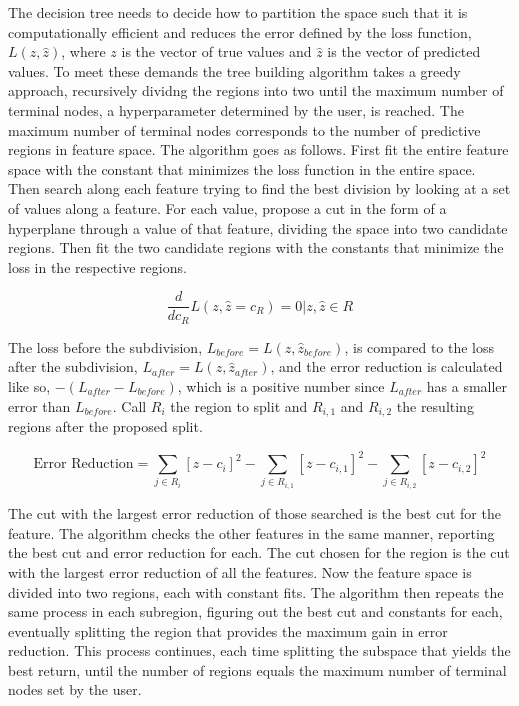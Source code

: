 \documentclass[12pt]{article}
\begin{document}
The decision tree needs to decide how to partition the space such that it is computationally efficient and reduces the error defined by the loss function, $L(z,\hat{z})$, where $z$ is the vector of true values and $\hat{z}$ is the vector of predicted values. To meet these demands the tree building algorithm takes a greedy approach, recursively dividng the regions into two until the maximum number of terminal nodes, a hyperparameter determined by the user, is reached. The maximum number of terminal nodes corresponds to the number of predictive regions in feature space. The algorithm goes as follows. First fit the entire feature space with the constant that minimizes the loss function in the entire space. Then search along each feature trying to find the best division by looking at a set of values along a feature. For each value, propose a cut in the form of a hyperplane through a value of that feature, dividing the space into two candidate regions. Then fit the two candidate regions with the constants that minimize the loss in the respective regions. 

\begin{equation}
\frac{d}{dc_{R}} L(z,\hat{z} = c_{R}) = 0 | z,\hat{z} \in R
\end{equation}

The loss before the subdivision, $L_{before} = L(z,\hat{z}_{before})$, is compared to the loss after the subdivision, $L_{after} = L(z,\hat{z}_{after})$, and the error reduction is calculated like so, $-(L_{after} - L_{before})$, which is a positive number since $L_{after}$ has a smaller error than $L_{before}$. Call $R_{i}$ the region to split and $R_{i,1}$ and $R_{i,2}$ the resulting regions after the proposed split. 

\begin{equation}
\textrm{Error Reduction} = \sum_{j \in R_{i}} [z-c_i]^2 - \sum_{j \in R_{i,1}} [z-c_{i,1}]^2 - \sum_{j \in R_{i,2}} [z-c_{i,2}]^2
\end{equation}

The cut with the largest error reduction of those searched is the best cut for the feature. The algorithm checks the other features in the same manner, reporting the best cut and error reduction for each. The cut chosen for the region is the cut with the largest error reduction of all the features. Now the feature space is divided into two regions, each with constant fits. The algorithm then repeats the same process in each subregion, figuring out the best cut and constants for each, eventually splitting the region that provides the maximum gain in error reduction. This process continues, each time splitting the subspace that yields the best return, until the number of regions equals the maximum number of terminal nodes set by the user. 
\end{document}
